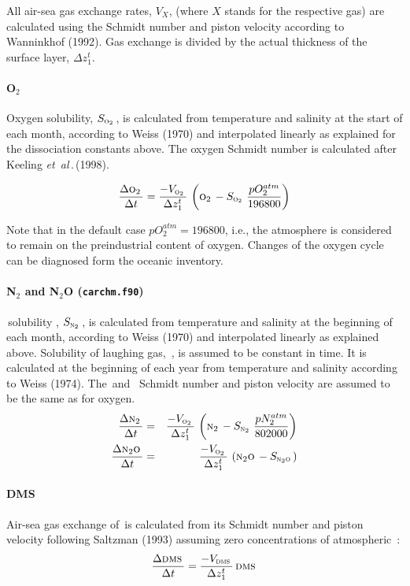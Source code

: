 \documentclass[11pt,a4paper,fleqn,twoside]{article}
\def\ntwo{\text{\textsc{n$_2$}}\,}
\def\ntwoo{\text{\textsc{n$_2$o}}\,}
\def\oxy{\text{\textsc{o$_2$}}\,}
\def\dms{\text{\textsc{dms}}\,}
\def\dms{\text{\textsc{dms}}\,}
\newcommand{\etal}{{\em et~al\,}.\,}
\begin{document}
All air-sea gas exchange rates, $V_{X}$,  (where $X$ stands for the respective
gas) are calculated using the Schmidt number and piston velocity according to
Wanninkhof (1992)\nocite{wanninkhof:1992}. Gas exchange is
divided by the actual thickness of the surface layer, $\Delta z^t_1$.

\paragraph{O$_2$} Oxygen solubility, $S_\oxy$,  is calculated from temperature
and salinity at the start of each month, according to Weiss
(1970)\nocite{weiss:1970} and interpolated linearly as explained for the
dissociation constants above. The oxygen Schmidt number is
calculated after Keeling \etal (1998)\nocite{keeling:1998}. 

\begin{equation}
\frac{\Delta  \oxy}{\Delta  t} = \frac{-V_\oxy}{\Delta z^t_1}\, 
\left(\oxy-S_\oxy\, \frac{pO^{atm}_2}{196800}\right)
\end{equation}

Note that in the default case $pO_2^{atm} = 196800$, i.e., the atmosphere is
considered to remain on the preindustrial content of oxygen. Changes of the 
oxygen cycle can be diagnosed form the oceanic inventory.

\paragraph{N$_2$ and N$_2$O ({\tt carchm.f90})} \ntwo solubility , $S_\ntwo$, 
is calculated from temperature and salinity at the beginning of each month,
according to Weiss (1970)\nocite{weiss:1970} and interpolated linearly as
explained above. Solubility of laughing gas, \ntwoo, is assumed to be
constant in time. It is calculated at the beginning of each year from temperature
and salinity  according to Weiss (1974)\nocite{weiss:1974}. The \ntwo and \ntwoo
Schmidt number and piston  velocity are assumed to be the same as for oxygen.
\begin{eqnarray}
\frac{\Delta  \ntwo}{\Delta  t} & = & \frac{-V_\oxy}{\Delta z^t_1}\, 
\left(\ntwo-S_\ntwo\,\frac{pN^{atm}_2}{802000}\right)\\
\frac{\Delta  \ntwoo}{\Delta  t} & = & \frac{ -V_\oxy}{\Delta z^t_1}\, 
\left(\ntwoo-S_\ntwoo\right)
\end{eqnarray}

\paragraph{DMS} Air-sea gas exchange of \dms is calculated from
its Schmidt number and piston velocity following Saltzman (1993)
\nocite{saltzman:1993} assuming zero concentrations of atmospheric \dms:
\begin{equation}
\frac{\Delta  \dms}{\Delta  t} = \frac{-V_\dms}{\Delta z^t_1}\, \dms
\end{equation}
\end{document}
